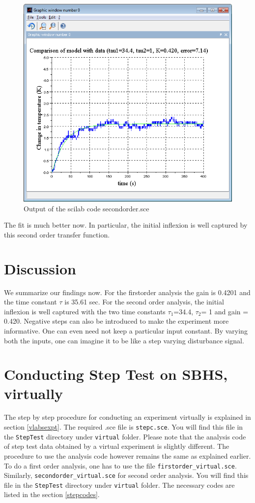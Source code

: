 \begin{figure}
\centering
\includegraphics[width=\linewidth]{Step-test_manual/Sorder_fit.png}
\caption{Output of the scilab code \ttfamily secondorder.sce}
\label{sorder}
\end{figure}

The fit is much better now.  In particular, the initial inflexion is well captured by this second
order transfer function.


\section{Discussion}
We summarize our findings now. For the firstorder analysis the gain is 0.4201 and the time constant $\tau$ is 35.61 sec. For the second order analysis, the initial inflexion is well captured with the two time constants $\tau_1$=34.4, $\tau_2$= 1 and gain = 0.420. Negative steps can also be introduced to make the experiment more informative. One can even need not keep a particular input constant. By varying both the inputs, one can imagine it to be like a step varying disturbance signal.
 
\section{Conducting Step Test on SBHS, virtually}
The step by step procedure for conducting an experiment virtually is explained in section \ref{vlabsexpt}. The required .sce file is {\tt stepc.sce}.  You will find this file in the {\tt StepTest} directory under {\tt virtual} folder. Please note that the analysis code of step test data obtained by a virtual experiment is slightly different. The procedure to use the analysis code however remains the same as explained earlier. To do a first order analysis, one has to use the file {\tt firstorder\_virtual.sce}. Similarly, {\tt secondorder\_virtual.sce} for second order analysis. You will find this file in the {\tt StepTest} directory under {\tt virtual} folder. The necessary codes are listed in the section \ref{stepcodes}.



